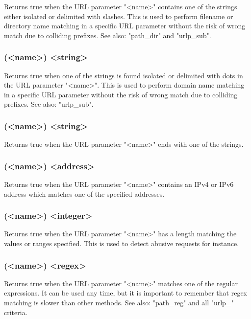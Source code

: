   Returns true when the URL parameter "<name>" contains one of the strings
  either isolated or delimited with slashes. This is used to perform filename
  or directory name matching in a specific URL parameter without the risk of
  wrong match due to colliding prefixes. See also: "path\_dir" and "urlp\_sub".

\subsubsection[urlp\_dom]{(<name>) <string>}

  Returns true when one of the strings is found isolated or delimited with dots
  in the URL parameter "<name>". This is used to perform domain name matching
  in a specific URL parameter without the risk of wrong match due to colliding
  prefixes. See also: "urlp\_sub".

\subsubsection[urlp\_end]{(<name>) <string>}

  Returns true when the URL parameter "<name>" ends with one of the strings.

\subsubsection[urlp\_ip]{(<name>) <address>}

  Returns true when the URL parameter "<name>" contains an IPv4 or IPv6 address
  which matches one of the specified addresses.

\subsubsection[urlp\_len]{(<name>) <integer>}

  Returns true when the URL parameter "<name>" has a length matching the values
  or ranges specified. This is used to detect abusive requests for instance.

\subsubsection[urlp\_reg]{(<name>) <regex>}

  Returns true when the URL parameter "<name>" matches one of the regular
  expressions. It can be used any time, but it is important to remember that
  regex matching is slower than other methods. See also: "path\_reg" and all
  "urlp\_" criteria.

